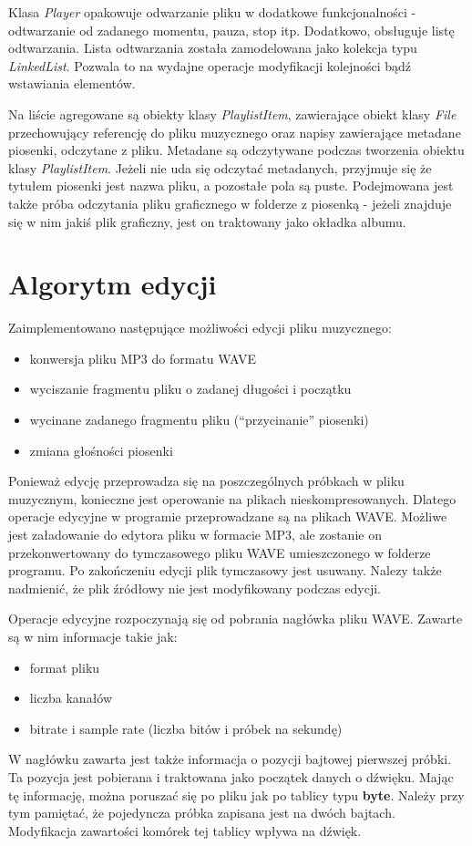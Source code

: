 \documentclass[12pt,a4paper,notitlepage]{article}
\begin{document}
Klasa \emph{Player} opakowuje odwarzanie pliku w dodatkowe funkcjonalności - odtwarzanie od zadanego momentu, pauza, stop itp. Dodatkowo, obsługuje listę odtwarzania.
Lista odtwarzania została zamodelowana jako kolekcja typu \emph{LinkedList}. Pozwala to na wydajne operacje modyfikacji kolejności bądź wstawiania elementów.

Na liście agregowane są 
obiekty klasy \emph{PlaylistItem}, zawierające obiekt klasy \emph{File} przechowujący referencję do pliku muzycznego oraz napisy zawierające metadane piosenki, odczytane z pliku. Metadane są 
odczytywane podczas tworzenia obiektu klasy \emph{PlaylistItem}. Jeżeli nie uda się odczytać metadanych, przyjmuje się że tytułem piosenki jest nazwa pliku, a pozostałe pola są puste. 
Podejmowana jest także próba odczytania pliku graficznego w folderze z piosenką - jeżeli znajduje się w nim jakiś plik graficzny, jest on traktowany jako okładka albumu. 

\section{Algorytm edycji}
\label{sec:edycja}
Zaimplementowano następujące możliwości edycji pliku muzycznego:
\begin{itemize}
 \item konwersja pliku MP3 do formatu WAVE
 \item wyciszanie fragmentu pliku o zadanej długości i początku
 \item wycinane zadanego fragmentu pliku (``przycinanie'' piosenki)
 \item zmiana głośności piosenki
\end{itemize}
Ponieważ edycję przeprowadza się na poszczególnych próbkach w pliku muzycznym, konieczne jest operowanie na plikach nieskompresowanych. Dlatego operacje edycyjne w programie przeprowadzane są na plikach WAVE. Możliwe jest załadowanie do edytora pliku w formacie MP3, ale zostanie on przekonwertowany do tymczasowego pliku WAVE umieszczonego w folderze programu. Po zakończeniu edycji plik tymczasowy jest usuwany. Nalezy także nadmienić, że plik źródłowy nie jest modyfikowany podczas edycji.

Operacje edycyjne rozpoczynają się od pobrania nagłówka pliku WAVE. Zawarte są w nim informacje takie jak:
\begin{itemize}
 \item format pliku
 \item liczba kanałów
 \item bitrate i sample rate (liczba bitów i próbek na sekundę)
\end{itemize}
W nagłówku zawarta jest także informacja o pozycji bajtowej pierwszej próbki. Ta pozycja jest pobierana i traktowana jako początek danych o dźwięku. Mając tę informację, można poruszać się po pliku jak po tablicy typu \textbf{byte}. Należy przy tym pamiętać, że pojedyncza próbka zapisana jest na dwóch bajtach. Modyfikacja zawartości komórek tej tablicy wpływa na dźwięk. 
\end{document}
